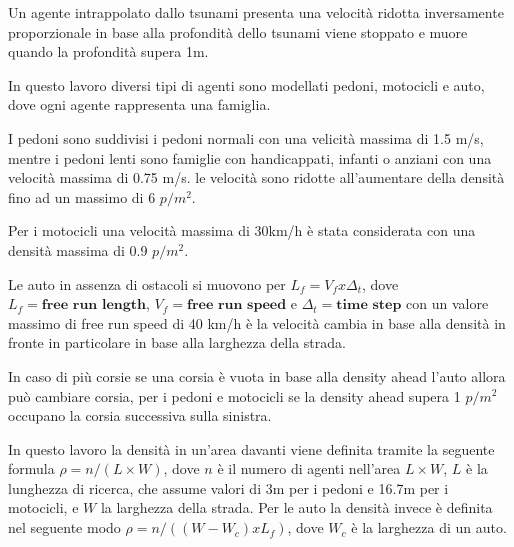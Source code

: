 Un agente intrappolato dallo tsunami presenta una velocità ridotta inversamente proporzionale in base
alla profondità dello tsunami viene stoppato e muore quando la profondità supera 1m.

\vspace*{5mm}

In questo lavoro diversi tipi di agenti sono modellati pedoni, motocicli e auto,
dove ogni agente rappresenta una famiglia.

\vspace*{5mm}

I pedoni sono suddivisi i pedoni normali con una velicità massima di 1.5 m/s,
mentre i pedoni lenti sono famiglie con handicappati, infanti o anziani con una velocità massima di 0.75 m/s.
le velocità sono ridotte all'aumentare della densità fino ad un massimo di 6 $p/m^2$.

\vspace*{5mm}

Per i motocicli una velocità massima di 30km/h è stata considerata con una densità massima di 0.9 $p/m^2$.

\vspace*{5mm}

Le auto in assenza di ostacoli si muovono per $L_{f} = V_{f} x \Delta_{t} $, dove $L_{f} = \textbf{free run length}$,
$V_{f} = \textbf{free run speed}$ e $\Delta_{t} = \textbf{time step}$
con un valore massimo di free run speed di 40 km/h è la velocità cambia in base
alla densità in fronte in particolare in base alla larghezza della strada.

\vspace*{5mm}

In caso di più corsie se una corsia è vuota in base alla density ahead l'auto allora può cambiare corsia,
per i pedoni e motocicli se la density ahead supera 1 $p/m^2$ occupano la corsia successiva sulla sinistra.

\vspace*{5mm}

In questo lavoro la densità in un'area davanti viene definita tramite la seguente formula
$\rho = n /(L \times W)$, dove $n$ è il numero di agenti nell'area $L \times W$, $L$ è la lunghezza di ricerca, 
che assume valori di 3m per i pedoni e 16.7m per i motocicli, e $W$ la larghezza della strada.
Per le auto la densità invece è definita nel seguente modo $\rho = n /((W - W_{c}) x L_{f})$, dove $W_{c}$ è la larghezza di un auto.

\vspace*{5mm}

